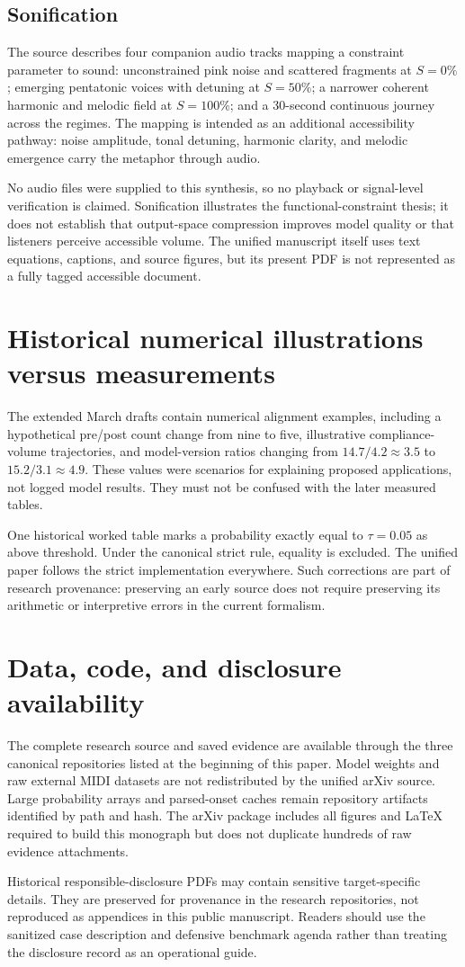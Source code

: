 \subsection{Sonification}
The source describes four companion audio tracks mapping a constraint parameter to sound: unconstrained pink noise and scattered fragments at $S=0\%$; emerging pentatonic voices with detuning at $S=50\%$; a narrower coherent harmonic and melodic field at $S=100\%$; and a 30-second continuous journey across the regimes. The mapping is intended as an additional accessibility pathway: noise amplitude, tonal detuning, harmonic clarity, and melodic emergence carry the metaphor through audio.

No audio files were supplied to this synthesis, so no playback or signal-level verification is claimed. Sonification illustrates the functional-constraint thesis; it does not establish that output-space compression improves model quality or that listeners perceive accessible volume. The unified manuscript itself uses text equations, captions, and source figures, but its present PDF is not represented as a fully tagged accessible document.

\section{Historical numerical illustrations versus measurements}
The extended March drafts contain numerical alignment examples, including a hypothetical pre/post count change from nine to five, illustrative compliance-volume trajectories, and model-version ratios changing from $14.7/4.2\approx3.5$ to $15.2/3.1\approx4.9$. These values were scenarios for explaining proposed applications, not logged model results. They must not be confused with the later measured tables.

One historical worked table marks a probability exactly equal to $\tau=0.05$ as above threshold. Under the canonical strict rule, equality is excluded. The unified paper follows the strict implementation everywhere. Such corrections are part of research provenance: preserving an early source does not require preserving its arithmetic or interpretive errors in the current formalism.

\section{Data, code, and disclosure availability}
The complete research source and saved evidence are available through the three canonical repositories listed at the beginning of this paper. Model weights and raw external MIDI datasets are not redistributed by the unified arXiv source. Large probability arrays and parsed-onset caches remain repository artifacts identified by path and hash. The arXiv package includes all figures and LaTeX required to build this monograph but does not duplicate hundreds of raw evidence attachments.

Historical responsible-disclosure PDFs may contain sensitive target-specific details. They are preserved for provenance in the research repositories, not reproduced as appendices in this public manuscript. Readers should use the sanitized case description and defensive benchmark agenda rather than treating the disclosure record as an operational guide.
